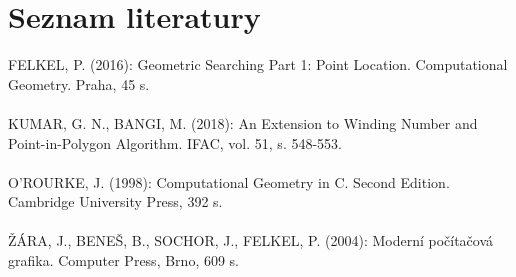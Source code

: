 \documentclass{article}
\begin{document}
\section{\large{Seznam literatury}}
FELKEL, P. (2016): Geometric Searching Part 1: Point Location. Computational Geometry. Praha, 45 s.\\
\vspace{0.1cm}\\
KUMAR, G. N., BANGI, M. (2018): An Extension to Winding Number and Point-in-Polygon Algorithm. IFAC, vol. 51, s. 548-553.\\
\vspace{0.1cm}\\
O'ROURKE, J. (1998): Computational Geometry in C. Second Edition. Cambridge University Press, 392 s.\\
\vspace{0.1cm}\\
ŽÁRA, J., BENEŠ, B., SOCHOR, J., FELKEL, P. (2004): Moderní počítačová grafika. Computer Press, Brno, 609 s.\\
\end{document}
